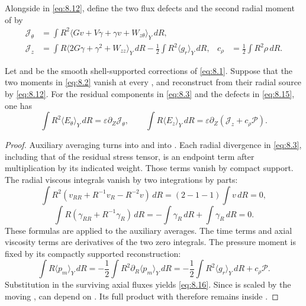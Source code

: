 %
Alongside  in \eqref{eq:8.12}, define the two flux defects and the
second radial moment  of  by
\begin{equation}
\begin{aligned}
\mathcal J_\theta
  &=\int R^2\langle Gv+V\gamma+\gamma v+W_{z\theta}\rangle_Y\,dR,\\
\mathcal J_z
  &=\int R\langle2G\gamma+\gamma^2+W_{zz}\rangle_Y\,dR
    -\frac12\int R^2\langle g_r\rangle_Y\,dR,
&c_\rho&=\frac12\int R^2\rho\,dR.
\end{aligned}
\tag{8.15}\label{eq:8.15}
\end{equation}

\begin{proposition}\label{prop:8.4}
Let  and  be the smooth
shell-supported corrections of \eqref{eq:8.1}. Suppose that the two moments in \eqref{eq:8.2}
vanish at every , and reconstruct  from their
radial source  by \eqref{eq:8.12}. For the residual components
 in \eqref{eq:8.3} and the defects
 in \eqref{eq:8.15}, one has
\begin{equation}
\int R^2\langle E_\theta\rangle_Y\,dR
=\varepsilon\partial_Z\mathcal J_\theta,
\qquad
\int R\langle E_z\rangle_Y\,dR
=\varepsilon\partial_Z(\mathcal J_z+c_\rho\mathcal P).
\tag{8.16}\label{eq:8.16}
\end{equation}
\end{proposition}

\begin{proof}
Auxiliary averaging turns  into  and
 into . Each radial
divergence in \eqref{eq:8.3}, including that of the residual stress tensor, is an endpoint term after
multiplication by its indicated weight. Those terms vanish by compact support. The radial viscous
integrals vanish by two integrations by parts:
\[
\int R^2(v_{RR}+R^{-1}v_R-R^{-2}v)\,dR
=(2-1-1)\int v\,dR=0,
\]
\[
\int R(\gamma_{RR}+R^{-1}\gamma_R)\,dR
=-\int\gamma_R\,dR+\int\gamma_R\,dR=0.
\]
These formulas are applied to the auxiliary averages. The time terms and axial viscosity terms are
derivatives of the two zero integrals. The pressure moment is fixed by its compactly supported
reconstruction:
\[
\int R\langle p_m\rangle_Y\,dR
=-\frac12\int R^2\partial_R\langle p_m\rangle_Y\,dR
=-\frac12\int R^2\langle g_r\rangle_Y\,dR+c_\rho\mathcal P.
\]
Substitution in the surviving axial fluxes yields \eqref{eq:8.16}. Since
 is scaled by the moving ,
 can depend on . Its full product with
 therefore remains inside .
\end{proof}

